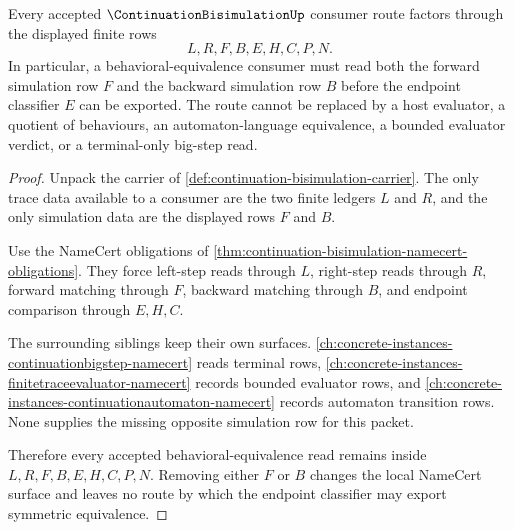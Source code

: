 \begin{theorem}
\label{thm:continuation-bisimulation-nonescape}
Every accepted $\ContinuationBisimulationUp$ consumer route factors through the displayed finite rows
$$
L,R,F,B,E,H,C,P,N.
$$
In particular, a behavioral-equivalence consumer must read both the forward simulation row $F$ and the backward simulation row $B$ before the endpoint classifier $E$ can be exported. The route cannot be replaced by a host evaluator, a quotient of behaviours, an automaton-language equivalence, a bounded evaluator verdict, or a terminal-only big-step read.
\end{theorem}
\begin{proof}
Unpack the carrier of \autoref{def:continuation-bisimulation-carrier}. The only trace data available to a consumer are the two finite ledgers $L$ and $R$, and the only simulation data are the displayed rows $F$ and $B$.

Use the NameCert obligations of \autoref{thm:continuation-bisimulation-namecert-obligations}. They force left-step reads through $L$, right-step reads through $R$, forward matching through $F$, backward matching through $B$, and endpoint comparison through $E,H,C$.

The surrounding siblings keep their own surfaces. \autoref{ch:concrete-instances-continuationbigstep-namecert} reads terminal rows, \autoref{ch:concrete-instances-finitetraceevaluator-namecert} records bounded evaluator rows, and \autoref{ch:concrete-instances-continuationautomaton-namecert} records automaton transition rows. None supplies the missing opposite simulation row for this packet.

Therefore every accepted behavioral-equivalence read remains inside $L,R,F,B,E,H,C,P,N$. Removing either $F$ or $B$ changes the local NameCert surface and leaves no route by which the endpoint classifier may export symmetric equivalence.
\end{proof}

